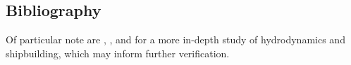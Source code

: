\documentclass[../main.tex]{subfiles}
\begin{document}
\subsection*{Bibliography}
Of particular note are \cite{MANEnergySolutions2023}, \cite{UnitedStatesNavalAcademy2021}, and \cite{ITTC2021} for a more in-depth study of hydrodynamics and shipbuilding, which may inform further verification.
\end{document}
